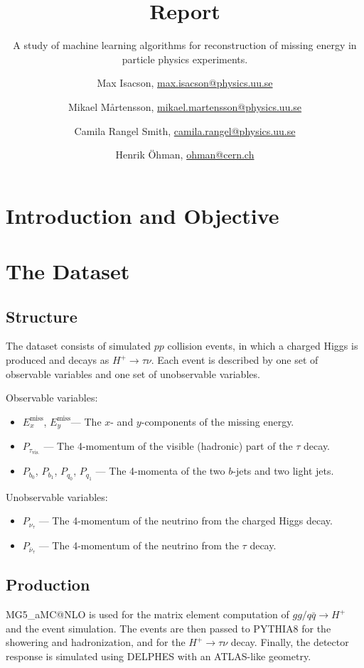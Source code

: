 \documentclass{scrartcl}
\title{Report}
\subtitle{A study of machine learning algorithms for reconstruction of missing energy in particle physics experiments.}
\author{
  Max Isacson, \url{max.isacson@physics.uu.se}
  \and
  Mikael M\aa rtensson, \url{mikael.martensson@physics.uu.se}
  \and
  Camila Rangel Smith, \url{camila.rangel@physics.uu.se}
  \and
  Henrik Öhman, \url{ohman@cern.ch}
}
\newcommand{\exmiss}{$E_x^\text{miss}$}
\newcommand{\eymiss}{$E_y^\text{miss}$}
\begin{document}
\maketitle


\section{Introduction and Objective}

\section{The Dataset}
\subsection{Structure}
The dataset consists of simulated $pp$ collision events, in which a charged Higgs is produced and decays as $H^+\to\tau\nu$. Each event is described by one set of observable variables and one set of unobservable variables.

Observable variables:
\begin{itemize}
    \item \exmiss, \eymiss --- The $x$- and $y$-components of the missing energy.
    \item $P_{\tau_\mathrm{vis.}}$ --- The 4-momentum of the visible (hadronic) part of the $\tau$ decay.
    \item $P_{b_0}$, $P_{b_1}$, $P_{q_0}$, $P_{q_1}$ --- The 4-momenta of the two $b$-jets and two light jets.
\end{itemize}

Unobservable variables:
\begin{itemize}
    \item $P_{\nu_\tau}$ --- The 4-momentum of the neutrino from the charged Higgs decay.
    \item $P_{\bar\nu_\tau}$ --- The 4-momentum of the neutrino from the $\tau$ decay.
\end{itemize}

\subsection{Production}
MG5\_aMC@NLO \cite{Alwall:2014hca} is used for the matrix element computation of $gg / q \bar q \to H^+$ and the event simulation. The events are then passed to PYTHIA8 \cite{Sjöstrand2015159} for the showering and hadronization, and for the $H^+\to \tau\nu$ decay. Finally, the detector response is simulated using DELPHES \cite{Favereau2014} with an ATLAS-like geometry.
\end{document}
